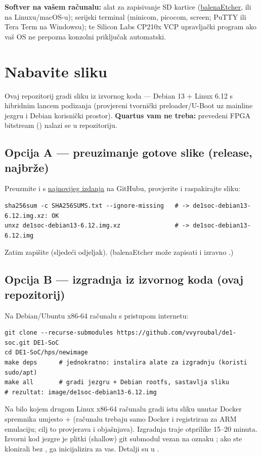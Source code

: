 \noindent\textbf{Softver na vašem računalu:} alat za zapisivanje SD kartice
(\href{https://etcher.balena.io/}{balenaEtcher}, ili  na Linuxu/macOS-u);
serijski terminal (minicom, picocom, screen; PuTTY ili Tera Term na Windowsu); te
Silicon Labs CP210x VCP upravljački program ako vaš OS ne prepozna konzolni
priključak automatski.

\section{Nabavite sliku}
Ovaj repozitorij gradi sliku iz izvornog koda --- Debian 13 + Linux 6.12 s hibridnim lancem
podizanja (provjereni tvornički preloader/U-Boot uz mainline jezgru i Debian
korisnički prostor). \textbf{Quartus vam ne treba:} prevedeni FPGA bitstream
() nalazi se u repozitoriju.

\subsection{Opcija A --- preuzimanje gotove slike (release, najbrže)}
Preuzmite  i  s
\href{https://github.com/vvyroubal/de1-soc/releases/latest}{najnovijeg izdanja} na GitHubu, provjerite i raspakirajte sliku:
\begin{lstlisting}
sha256sum -c SHA256SUMS.txt --ignore-missing   # -> de1soc-debian13-6.12.img.xz: OK
unxz de1soc-debian13-6.12.img.xz               # -> de1soc-debian13-6.12.img
\end{lstlisting}
Zatim zapišite  (sljedeći odjeljak). (balenaEtcher
može zapisati i izravno .)

\subsection{Opcija B --- izgradnja iz izvornog koda (ovaj repozitorij)}
Na Debian/Ubuntu x86-64 računalu s pristupom internetu:
\begin{lstlisting}
git clone --recurse-submodules https://github.com/vvyroubal/de1-soc.git DE1-SoC
cd DE1-SoC/hps/newimage
make deps      # jednokratno: instalira alate za izgradnju (koristi sudo/apt)
make all       # gradi jezgru + Debian rootfs, sastavlja sliku
# rezultat: image/de1soc-debian13-6.12.img
\end{lstlisting}
Na bilo kojem drugom Linux x86-64 računalu  gradi istu
sliku unutar Docker spremnika umjesto  +  (računalu
trebaju samo Docker i  registriran za ARM emulaciju; cilj to
provjerava i objašnjava). Izgradnja traje otprilike 15--20 minuta.
Izvorni kod jezgre je plitki (shallow) git submodul vezan na oznaku ; ako ste
klonirali bez ,  ga inicijalizira za vas.
Detalji su u .

